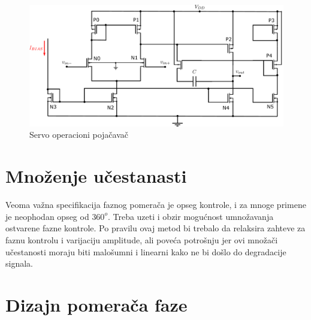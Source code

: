 \documentclass[journal,twocolumn,letterpaper]{IEEEJERM}
\begin{document}
\begin{figure}[!htbp]
  \centering
  \includegraphics[width=\linewidth]{servo_oa.pdf}
  \caption{Servo operacioni pojačavač}
  \label{fig:servo_oa}
\end{figure}

\section{Množenje učestanasti}

Veoma važna specifikacija faznog pomerača je opseg kontrole, i za mnoge primene je neophodan opseg od $360^o$. Treba uzeti i obzir mogućnost umnožavanja ostvarene fazne kontrole. Po pravilu ovaj metod bi trebalo da relaksira zahteve za faznu kontrolu i varijaciju amplitude, ali poveća potrošnju jer ovi množači učestanosti moraju biti malošumni i linearni kako ne bi došlo do degradacije signala. \cite{ellinger10}


\section{Dizajn pomerača faze}
\end{document}
